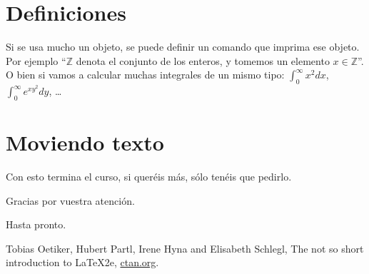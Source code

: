\documentclass[11pt]{amsart}
\begin{document}
\section{Definiciones}

\newcommand{\Z}{{\mathbb Z}}
\newcommand{\f}[2]{{\int_0^\infty #1 d #2}}

Si se usa mucho un objeto, se puede definir un comando que imprima ese objeto. Por ejemplo ``$\Z$ denota el conjunto de los enteros, y tomemos un elemento $x\in \Z$''. O bien si vamos a calcular muchas integrales de un mismo tipo: $\f{x^2}{x}$, $\f{e^{xy^2}}{y}$, \ldots



\section{Moviendo texto}

\begin{center}
Con esto termina el curso, si queréis más, sólo tenéis que pedirlo.

Gracias por vuestra atención.
\end{center}

\hfill Hasta pronto.


\begin{thebibliography}{10}
 Tobias Oetiker, Hubert Partl, Irene Hyna and Elisabeth Schlegl, The not so short introduction to \LaTeX2e, \href{http://www.ctan.org/tex-archive/info/lshort/english/lshort.pdf}{ctan.org}.
\end{thebibliography}
\end{document}
